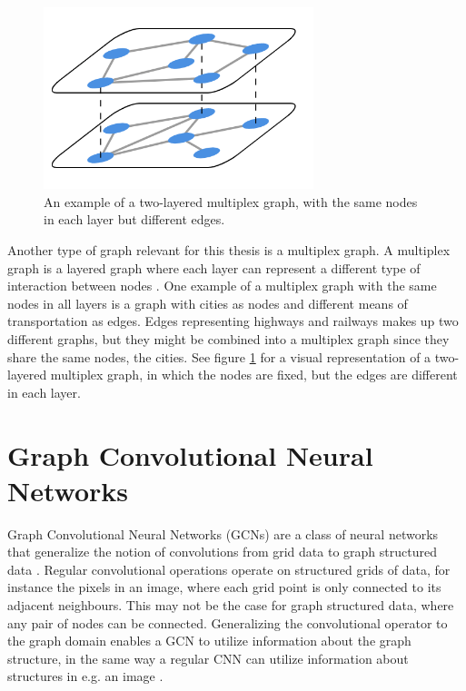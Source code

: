 \begin{figure}[H]
    \centering
    \includegraphics[width=0.7\textwidth]{chapters/images_theory/multiplex.png}
    \caption{An example of a two-layered multiplex graph, with the same nodes in each layer but different edges.}
    \label{fig:multiplex_graph}
\end{figure}
Another type of graph relevant for this thesis is a multiplex graph. A multiplex graph is a layered graph where each layer can represent a different type of interaction between nodes \cite{multiplex_book_chap2}. One example of a multiplex graph with the same nodes in all layers is a graph with cities as nodes and different means of transportation as edges. Edges representing highways and railways makes up two different graphs, but they might be combined into a multiplex graph since they share the same nodes, the cities. See figure \ref{fig:multiplex_graph} for a visual representation of a two-layered multiplex graph, in which the nodes are fixed, but the edges are different in each layer.

\section{Graph Convolutional Neural Networks}
\label{sec:gcn}

Graph Convolutional Neural Networks (GCNs) are a class of neural networks that generalize the notion of convolutions from grid data to graph structured data \cite{wu_review}. Regular convolutional operations operate on structured grids of data, for instance the pixels in an image, where each grid point is only connected to its adjacent neighbours. This may not be the case for graph structured data, where any pair of nodes can be connected. Generalizing the convolutional operator to the graph domain enables a GCN to utilize information about the graph structure, in the same way a regular CNN can utilize information about structures in e.g. an image \cite{wu_review}.

